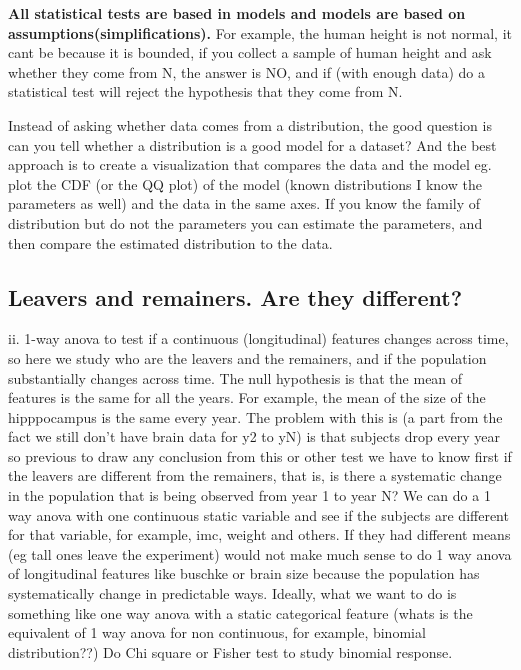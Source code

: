 \documentclass[11pt]{article}
\theoremstyle{definition}
\theoremstyle{remark}
\begin{document}
\textbf{All statistical tests are based in models and models are based on assumptions(simplifications).}
For example, the human height is not normal, it cant be because it is bounded, if you collect a sample of human height and ask whether they come from N, the answer is NO, and if (with enough data) do a statistical test will reject the hypothesis that they come from N.

Instead of asking whether data comes from a distribution, the good question is can you tell whether a distribution is a good model for a dataset?
 And the best approach is to create a visualization that compares the data and the model eg. plot the CDF (or the QQ plot) of the model (known distributions I know the parameters as well) and the data in the same axes. If you know the family of distribution but do not the parameters you can estimate the parameters, and then compare the estimated distribution to the data.





\subsection{Leavers and remainers. Are they different?}
\label{sse:res}
ii. 1-way anova to test if a continuous (longitudinal) features changes across time, so here we study who are the leavers and the remainers, and if the population substantially changes across time. The null hypothesis is that the mean of features is the same for all the years. For example, the mean of the size of the hipppocampus is the same every year. The problem with this is (a part from the fact we still don't have brain data for y2 to yN) is that subjects drop every year so previous to draw any conclusion from this or other test we have to know first if the leavers are different from the remainers, that is, is there a systematic change in the population that is being observed from year 1 to year N?
We can do a 1 way anova with one continuous static variable and see if the subjects are different for that variable, for example, imc, weight and others. If they had different means (eg tall ones leave the experiment) would not make much sense to do 1 way anova of longitudinal features like buschke or brain size because the population has systematically change in predictable ways.
Ideally, what we want to do is something like one way anova with a static categorical feature (whats is the equivalent of 1 way anova for non continuous, for example, binomial distribution??) Do Chi square or Fisher test to study binomial response.
\end{document}
